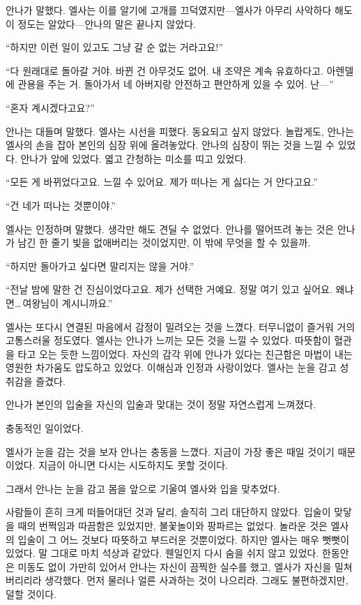 안나가 말했다. 엘사는 이를 알기에 고개를 끄덕였지만—엘사가 아무리 사악하다 해도 이 정도는 알았다—안나의 말은 끝나지 않았다.

``하지만 이런 일이 있고도 그냥 갈 순 없는 거라고요!''

``다 원래대로 돌아갈 거야. 바뀐 건 아무것도 없어. 내 조약은 계속 유효하다고. 아렌델에 관용을 주는 거. 돌아가서 네 아버지랑 안전하고 편안하게 있을 수 있어. 난—''

``혼자 계시겠다고요?''

안나는 대들며 말했다. 엘사는 시선을 피했다. 동요되고 싶지 않았다. 놀랍게도, 안나는 엘사의 손을 잡아 본인의 심장 위에 올려놓았다. 안나의 심장이 뛰는 것을 느낄 수 있었다. 안나가 앞에 있었다. 엷고 간청하는 미소를 띠고 있었다.

``모든 게 바뀌었다고요. 느낄 수 있어요. 제가 떠나는 게 싫다는 거 안다고요.''

`` 건 네가 떠나는 것뿐이야.''

엘사는 인정하며 말했다. 생각만 해도 견딜 수 없었다. 안나를 떨어뜨려 놓는 것은 안나가 남긴 한 줄기 빛을 없애버리는 것이었지만, 이 밖에 무엇을 할 수 있을까.

``하지만 돌아가고 싶다면 말리지는 않을 거야.''

``전날 밤에 말한 건 진심이었다고요. 제가 선택한 거예요. 정말 여기 있고 싶어요. 왜냐면\ldots\,여왕님이 계시니까요.''

엘사는 또다시 연결된 마음에서 감정이 밀려오는 것을 느꼈다. 터무니없이 즐거워 거의 고통스러울 정도였다. 엘사는 안나가 느끼는 모든 것을 느낄 수 있었다. 따뜻함이 혈관을 타고 오는 듯한 느낌이었다. 자신의 감각 위에 안나가 있다는 친근함은 마법이 내는 영원한 차가움도 압도하고 있었다. 이해심과 인정과 사랑이었다. 엘사는 눈을 감고 성취감을 즐겼다.

안나가 본인의 입술을 자신의 입술과 맞대는 것이 정말 자연스럽게 느껴졌다.

\textbreak

충동적인 일이었다.

엘사가 눈을 감는 것을 보자 안나는 충동을 느꼈다. 지금이 가장 좋은 때일 것이기 때문이었다. 지금이 아니면 다시는 시도하지도 못할 것이다.

그래서 안나는 눈을 감고 몸을 앞으로 기울여 엘사와 입을 맞추었다.

사람들이 흔히 크게 떠들어대던 것과 달리, 솔직히 그리 대단하지 않았다. 입술이 맞닿을 때의 번쩍임과 따끔함은 있었지만, 불꽃놀이와 팡파르는 없었다. 놀라운 것은 엘사의 입술이 그 어느 것보다 따뜻하고 부드러운 것뿐이었다. 하지만 엘사는 매우 뻣뻣이 있었다. 말 그대로 마치 석상과 같았다. 웬일인지 다시 숨을 쉬지 않고 있었다. 한동안은 미동도 없이 가만히 있어서 안나는 자신이 끔찍한 실수를 했고, 엘사가 자신을 밀쳐버리리라 생각했다. 먼저 물러나 얼른 사과하는 것이 나으리라. 그래도 불편하겠지만, 덜할 것이다.

